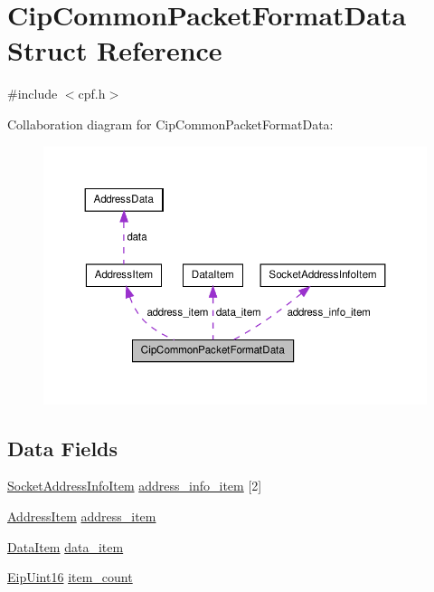 \hypertarget{structCipCommonPacketFormatData}{\section{\-Cip\-Common\-Packet\-Format\-Data \-Struct \-Reference}
\label{db/d80/structCipCommonPacketFormatData}
}


{\ttfamily \#include $<$cpf.\-h$>$}



\-Collaboration diagram for \-Cip\-Common\-Packet\-Format\-Data\-:
\nopagebreak
\begin{figure}[H]
\begin{center}
\leavevmode
\includegraphics[width=350pt]{dd/d41/structCipCommonPacketFormatData__coll__graph}
\end{center}
\end{figure}
\subsection*{\-Data \-Fields}
\begin{DoxyCompactItemize}
\item 
\hyperlink{structSocketAddressInfoItem}{\-Socket\-Address\-Info\-Item} \hyperlink{structCipCommonPacketFormatData_afc2883222efe7445cb7836d5da872f54}{address\-\_\-info\-\_\-item} \mbox{[}2\mbox{]}
\item 
\hyperlink{structAddressItem}{\-Address\-Item} \hyperlink{structCipCommonPacketFormatData_a6f7f7299bfdc600609c9b9f8fc55ac5b}{address\-\_\-item}
\item 
\hyperlink{structDataItem}{\-Data\-Item} \hyperlink{structCipCommonPacketFormatData_a054b7138d1a6837b9ade41b17635bc96}{data\-\_\-item}
\item 
\hyperlink{typedefs_8h_ac1b4cfa25b4f5def62f23b455dd395d8}{\-Eip\-Uint16} \hyperlink{structCipCommonPacketFormatData_a7ff1108c27f9ebe1d69305311c6b234b}{item\-\_\-count}
\end{DoxyCompactItemize}


